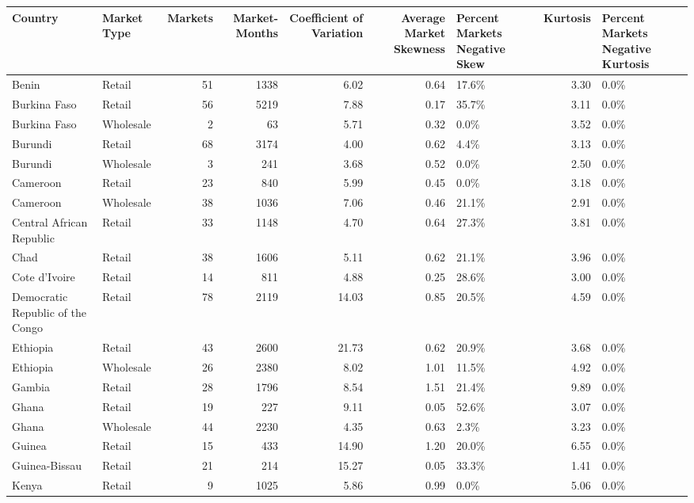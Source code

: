 \begin{table}[ht]
\centering
\begin{tabular}{llrrrrlrl}
  \hline
Country & Market Type & Markets & Market-Months & Coefficient of 
 Variation & Average Market Skewness  & Percent Markets Negative Skew & Kurtosis & Percent Markets Negative Kurtosis \\ 
  \hline
Benin & Retail &  51 & 1338 & 6.02 & 0.64 & 17.6\% & 3.30 & 0.0\% \\ 
  Burkina Faso & Retail &  56 & 5219 & 7.88 & 0.17 & 35.7\% & 3.11 & 0.0\% \\ 
  Burkina Faso & Wholesale &   2 &  63 & 5.71 & 0.32 & 0.0\% & 3.52 & 0.0\% \\ 
  Burundi & Retail &  68 & 3174 & 4.00 & 0.62 & 4.4\% & 3.13 & 0.0\% \\ 
  Burundi & Wholesale &   3 & 241 & 3.68 & 0.52 & 0.0\% & 2.50 & 0.0\% \\ 
  Cameroon & Retail &  23 & 840 & 5.99 & 0.45 & 0.0\% & 3.18 & 0.0\% \\ 
  Cameroon & Wholesale &  38 & 1036 & 7.06 & 0.46 & 21.1\% & 2.91 & 0.0\% \\ 
  Central African Republic & Retail &  33 & 1148 & 4.70 & 0.64 & 27.3\% & 3.81 & 0.0\% \\ 
  Chad & Retail &  38 & 1606 & 5.11 & 0.62 & 21.1\% & 3.96 & 0.0\% \\ 
  Cote d'Ivoire & Retail &  14 & 811 & 4.88 & 0.25 & 28.6\% & 3.00 & 0.0\% \\ 
  Democratic Republic of the Congo & Retail &  78 & 2119 & 14.03 & 0.85 & 20.5\% & 4.59 & 0.0\% \\ 
  Ethiopia & Retail &  43 & 2600 & 21.73 & 0.62 & 20.9\% & 3.68 & 0.0\% \\ 
  Ethiopia & Wholesale &  26 & 2380 & 8.02 & 1.01 & 11.5\% & 4.92 & 0.0\% \\ 
  Gambia & Retail &  28 & 1796 & 8.54 & 1.51 & 21.4\% & 9.89 & 0.0\% \\ 
  Ghana & Retail &  19 & 227 & 9.11 & 0.05 & 52.6\% & 3.07 & 0.0\% \\ 
  Ghana & Wholesale &  44 & 2230 & 4.35 & 0.63 & 2.3\% & 3.23 & 0.0\% \\ 
  Guinea & Retail &  15 & 433 & 14.90 & 1.20 & 20.0\% & 6.55 & 0.0\% \\ 
  Guinea-Bissau & Retail &  21 & 214 & 15.27 & 0.05 & 33.3\% & 1.41 & 0.0\% \\ 
  Kenya & Retail &   9 & 1025 & 5.86 & 0.99 & 0.0\% & 5.06 & 0.0\% \\ 

\end{tabular}
\end{table}
